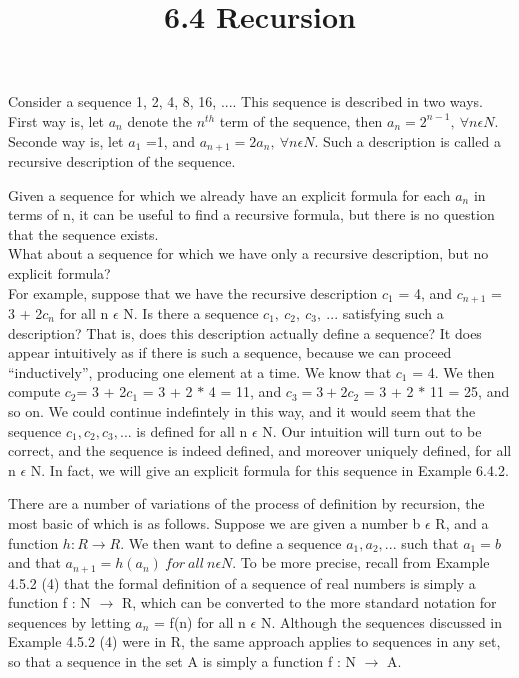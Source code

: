 \documentclass[a4paper,10pt]{report}
\title{6.4 Recursion}
\author{}
\begin{document}
\maketitle
Consider a sequence 1, 2, 4, 8, 16, .... This sequence is described in two ways. First way is, let $a_n$ denote the $n^{th}$ term of the sequence, then $a_n=2^{n-1},~ \forall n\epsilon{N}$. Seconde way is, let $a_1$ =1, and $a_{n+1}=2a_n,~ \forall n\epsilon{N}$. Such a description is called a recursive description of the sequence.

Given a sequence for which we already have an explicit formula for each $a_n$ in terms of n, it can be useful to find a recursive formula, but there is no question that the sequence exists.\\ What about a sequence for which we have only a recursive description, but no explicit formula?\\ For example, suppose that we have the recursive description $c_1$ = 4, and $c_{n+1}$ = 3 + 2$c_n$ for all n $\epsilon$ N. Is there a sequence $c_1,~ c_2,~ c_3,~ . . .$ satisfying such a description? That is, does this description actually define a sequence? It does appear intuitively as if there is such a sequence, because we can proceed “inductively”, producing one element at a time. We know that $c_1$ = 4. We then compute $c_2$= 3 + 2$c_1$ = 3 + 2 $*$ 4 = 11, and $c_3 = 3 + 2c_2$ = 3 + 2 $*$ 11 = 25, and so on. We could continue indefintely in this way, and it would seem that the sequence $c_1, c_2, c_3, . . .$ is defined for all n $\epsilon$ N. Our intuition will turn out to be correct, and the sequence is indeed defined, and moreover uniquely defined, for all n $\epsilon$ N. In fact, we will give an explicit formula for this sequence in Example 6.4.2.

There are a number of variations of the process of definition by recursion, the most basic of which is as follows. Suppose we are given a number b $\epsilon$ R, and a function $h:R\rightarrow R$. We then want to define a sequence $a_1,a_2, ...$ such that $a_1=b$ and that $a_{n+1}=h(a_n)~for ~all~  n \epsilon N$. To be more precise, recall from Example 4.5.2 (4) that the formal definition of a sequence of real numbers is simply a function f : N $\rightarrow$ R, which can be converted to the more standard notation for sequences by letting $a_n$ = f(n) for all n $\epsilon$ N. Although the sequences discussed in Example 4.5.2 (4) were in R, the same approach applies to sequences in any set, so that a sequence in the set A is simply a function f : N $\rightarrow$ A.
\end{document}

